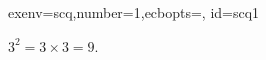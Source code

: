 \begin{SolutionCollapsible}{exenv=scq,number=1,ecbopts={}, id=scq1}

		$3^2=3\times 3 = 9$.
	
\end{SolutionCollapsible}
